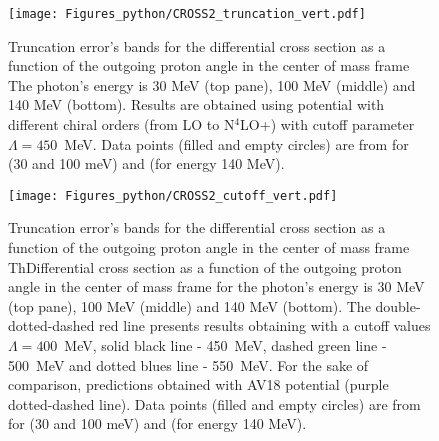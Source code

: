     \begin{figure}[h]
        \begin{center}
        \texttt{[image: Figures\_python/CROSS2\_truncation\_vert.pdf]}
        \end{center}
        \caption{Truncation error's bands for the differential cross section 
        as a function of the outgoing proton angle in the center of mass frame 
        The photon's energy is 30 MeV (top pane), 100 MeV (middle) and 140 MeV (bottom). Results are obtained using potential
        with different chiral orders (from LO to N$^4$LO+) with cutoff parameter $\Lambda=450$~MeV.
        Data points (filled and empty circles) are from \cite{Ying_Experiment_Deut}
        for (30 and 100 meV)
        and \cite{DeSanctis_Experiment_Deut} (for energy 140 MeV).}
        \label{Diff_cross_truncation}
    \end{figure}

    

    \begin{figure}[h]
        \begin{center}
        \texttt{[image: Figures\_python/CROSS2\_cutoff\_vert.pdf]}
        \end{center}
        \caption{Truncation error's bands for the differential cross section 
        as a function of the outgoing proton angle in the center of mass frame 
        ThDifferential cross section as a function of the outgoing proton angle in the center of mass frame 
        for the photon's energy is 30 MeV (top pane), 100 MeV (middle) and 140 MeV (bottom). 
        The double-dotted-dashed red line presents results obtaining with 
        a cutoff values $\Lambda=400$~MeV, solid black line - 450~MeV, dashed green line - 500~MeV
    and dotted blues line - 550~MeV.
        For the sake of comparison, predictions obtained with AV18 potential (purple dotted-dashed line).
        Data points (filled and empty circles) are from \cite{Ying_Experiment_Deut}
        for (30 and 100 meV)
        and \cite{DeSanctis_Experiment_Deut} (for energy 140 MeV).}
        \label{Diff_cross_cutoff}
    \end{figure}

    
        
        

